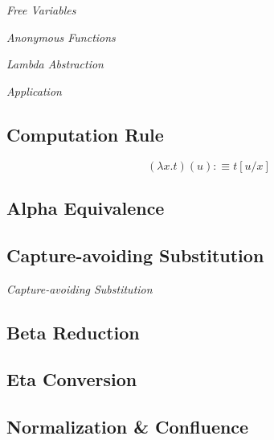 \documentclass{article}
\begin{document}
\emph{Free Variables}

\emph{Anonymous Functions}

\emph{Lambda Abstraction}

\emph{Application}

\subsection{Computation Rule}\label{subsec:computation_rule}

\[
    (\lambda x.t)(u) :\equiv t[u/x]
\]

\subsection{Alpha Equivalence}\label{subsec:alpha_equivalent}

\subsection{Capture-avoiding Substitution}\label{subsec:capture_avoiding}

\emph{Capture-avoiding Substitution}

\subsection{Beta Reduction}\label{subsec:beta_reduction}

\subsection{Eta Conversion}\label{subsec:eta_conversion}

\subsection{Normalization \& Confluence}\label{subsec:normalization_confluence}
\end{document}
